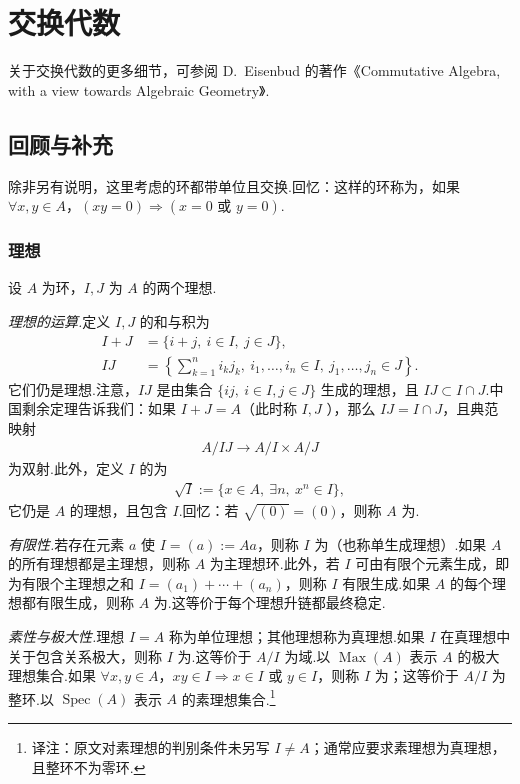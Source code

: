 \chapter{交换代数}\label{chap:nt-2}
关于交换代数的更多细节，可参阅 D.~Eisenbud 的著作《Commutative Algebra, with a view towards Algebraic Geometry》.

\section{回顾与补充}\label{sec:nt-2-1}
除非另有说明，这里考虑的环都带单位且交换.回忆：这样的环称为，如果 $\forall x,y\in A$，$(xy=0)\Rightarrow(x=0\text{ 或 }y=0)$.

\subsection{理想}\label{sec:nt-2-1-1}
设 $A$ 为环，$I,J$ 为 $A$ 的两个理想.

\emph{理想的运算.}定义 $I,J$ 的和与积为
\begin{align*}
I+J&=\{i+j,\ i\in I,\ j\in J\},\\
IJ&=\left\{\sum_{k=1}^{n}i_kj_k,\ i_1,\ldots,i_n\in I,\ j_1,\ldots,j_n\in J\right\}.
\end{align*}
它们仍是理想.注意，$IJ$ 是由集合 $\{ij,\ i\in I,j\in J\}$ 生成的理想，且 $IJ\subset I\cap J$.中国剩余定理告诉我们：如果 $I+J=A$（此时称 $I,J$ ），那么 $IJ=I\cap J$，且典范映射
\begin{align*}
A/IJ\longrightarrow A/I\times A/J
\end{align*}
为双射.此外，定义 $I$ 的为
\begin{align*}
\sqrt I:=\{x\in A,\ \exists n,\ x^n\in I\},
\end{align*}
它仍是 $A$ 的理想，且包含 $I$.回忆：若 $\sqrt{(0)}=(0)$，则称 $A$ 为.

\emph{有限性.}若存在元素 $a$ 使 $I=(a):=Aa$，则称 $I$ 为（也称单生成理想）.如果 $A$ 的所有理想都是主理想，则称 $A$ 为主理想环.此外，若 $I$ 可由有限个元素生成，即为有限个主理想之和 $I=(a_1)+\cdots+(a_n)$，则称 $I$ 有限生成.如果 $A$ 的每个理想都有限生成，则称 $A$ 为.这等价于每个理想升链都最终稳定.

\emph{素性与极大性.}理想 $I=A$ 称为单位理想；其他理想称为真理想.如果 $I$ 在真理想中关于包含关系极大，则称 $I$ 为.这等价于 $A/I$ 为域.以 $\operatorname{Max}(A)$ 表示 $A$ 的极大理想集合.如果 $\forall x,y\in A$，$xy\in I\Rightarrow x\in I\text{ 或 }y\in I$，则称 $I$ 为；这等价于 $A/I$ 为整环.以 $\operatorname{Spec}(A)$ 表示 $A$ 的素理想集合.\footnote{译注：原文对素理想的判别条件未另写 $I\ne A$；通常应要求素理想为真理想，且整环不为零环.}


